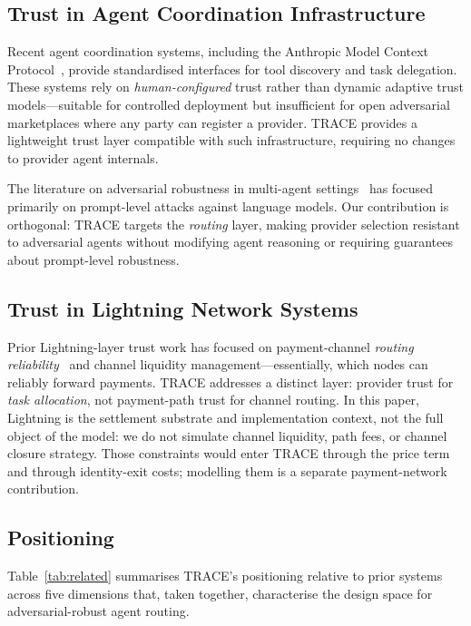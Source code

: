 \documentclass[sigconf,nonacm,10pt]{acmart}
\begin{document}
\subsection{Trust in Agent Coordination Infrastructure}

Recent agent coordination systems, including the Anthropic Model
Context Protocol~\cite{anthropic2024mcp}, provide standardised
interfaces for tool discovery and task delegation. These systems
rely on \emph{human-configured} trust rather than dynamic adaptive
trust models---suitable for controlled deployment but insufficient
for open adversarial marketplaces where any party can register a
provider. TRACE provides a lightweight trust layer compatible with
such infrastructure, requiring no changes to provider agent
internals.

The literature on adversarial robustness in multi-agent
settings~\cite{perez2022ignore} has focused primarily on
prompt-level attacks against language models. Our contribution is
orthogonal: TRACE targets the \emph{routing} layer, making provider
selection resistant to adversarial agents without modifying agent
reasoning or requiring guarantees about prompt-level robustness.

\subsection{Trust in Lightning Network Systems}

Prior Lightning-layer trust work has focused on payment-channel
\emph{routing reliability}~\cite{sivaraman2020high} and channel
liquidity management---essentially, which nodes can reliably
forward payments. TRACE addresses a distinct layer: provider trust
for \emph{task allocation}, not payment-path trust for channel
routing. In this paper, Lightning is the settlement substrate and
implementation context, not the full object of the model: we do not
simulate channel liquidity, path fees, or channel closure strategy.
Those constraints would enter TRACE through the price term and through
identity-exit costs; modelling them is a separate payment-network
contribution.

\subsection{Positioning}

Table~\ref{tab:related} summarises TRACE's positioning relative to
prior systems across five dimensions that, taken together,
characterise the design space for adversarial-robust agent
routing.
\end{document}
